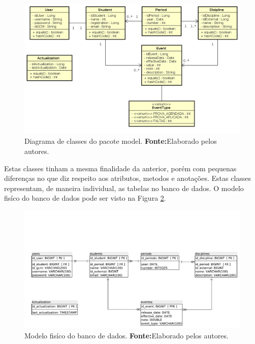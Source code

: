 	
	\begin{figure}[h!]
		\centerline{\includegraphics[scale=0.55]{./imagens/2_q_metodologico/4_procedimentos_resultados/43_webservice/432_desenvolvimento/diagrama.png}}
		\caption[Diagrama de classes do pacote model]{Diagrama de classes do pacote
		model.
			\textbf{Fonte:}Elaborado pelos autores.}
		\label{fig:desws12}
	\end{figure}
	
	\pagebreak
	
	\par Estas classes tinham a mesma finalidade da anterior, porém com pequenas
diferenças no que diz respeito aos atributos, metodos e anotações. Estas classes
representam, de maneira individual, as tabelas no banco de dados. O modelo
fisíco do banco de dados pode ser visto na Figura \ref{fig:desws12_1}.
	
	
	\begin{figure}[h!]
		\centerline{\includegraphics[scale=0.55]{./imagens/2_q_metodologico/4_procedimentos_resultados/43_webservice/432_desenvolvimento/mer_ws.pdf}}
		\caption[Modelo fisíco do banco de dados]{Modelo fisíco do banco de dados.
			\textbf{Fonte:}Elaborado pelos autores.}
		\label{fig:desws12_1}
	\end{figure}
	
